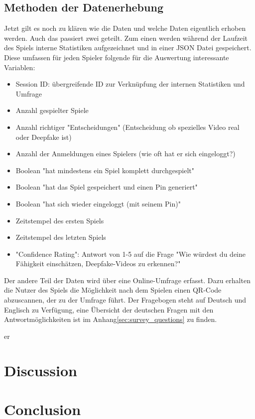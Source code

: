 \section{Methoden der Datenerhebung}
Jetzt gilt es noch zu klären wie die Daten und welche Daten eigentlich erhoben werden. 
Auch das passiert zwei geteilt. 
Zum einen werden während der Laufzeit des Spiels interne Statistiken aufgezeichnet und in einer JSON Datei gespeichert. 
Diese umfassen für jeden Spieler folgende für die Auswertung interessante Variablen:
\begin{itemize}
    \item Session ID: übergreifende ID zur Verknüpfung der internen Statistiken und Umfrage
    \item Anzahl gespielter Spiele
    \item Anzahl richtiger "Entscheidungen" (Entscheidung ob spezielles Video real oder Deepfake ist)
    \item Anzahl der Anmeldungen eines Spielers (wie oft hat er sich eingeloggt?)
    \item Boolean "hat mindestens ein Spiel komplett durchgespielt"
    \item Boolean "hat das Spiel gespeichert und einen Pin generiert"
    \item Boolean "hat sich wieder eingeloggt (mit seinem Pin)"
    \item Zeitstempel des ersten Spiels
    \item Zeitstempel des letzten Spiels
    \item "Confidence Rating": Antwort von 1-5 auf die Frage "Wie würdest du deine Fähigkeit einschätzen, Deepfake-Videos zu erkennen?"
\end{itemize}
Der andere Teil der Daten wird über eine Online-Umfrage erfasst. 
Dazu erhalten die Nutzer des Spiels die Möglichkeit nach dem Spielen einen QR-Code abzuscannen, der zu der Umfrage führt. 
Der Fragebogen steht auf Deutsch und Englisch zu Verfügung, 
eine Übersicht der deutschen Fragen mit den Antwortmöglichkeiten ist im Anhang\ref{sec:survey_questions} zu finden.


\gls{er}

\chapter{Discussion}

\chapter{Conclusion}
\label{sec:conclusion}

